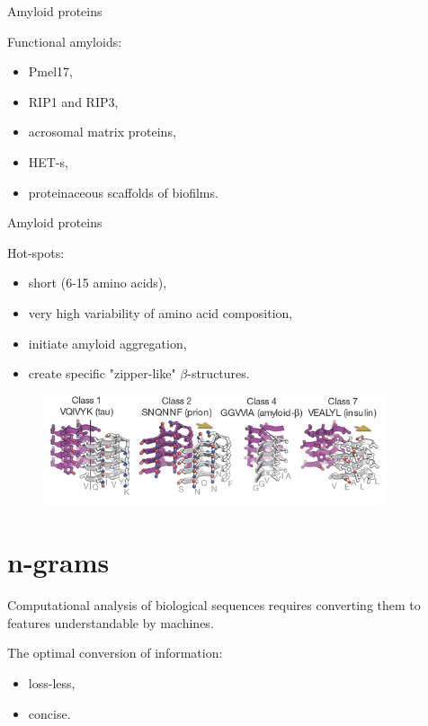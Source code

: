 \documentclass{beamer}\usepackage[]{graphicx}\usepackage[]{color}
\begin{document}
\begin{frame}{Amyloid proteins}

Functional amyloids:

\begin{itemize}
\item Pmel17,
\item RIP1 and RIP3,
\item acrosomal matrix proteins,
\item HET-s,
\item proteinaceous scaffolds of biofilms. 
\end{itemize}

\end{frame}  

  
\begin{frame}{Amyloid proteins}

Hot-spots:
\begin{itemize}
\item short (6-15 amino acids),
\item very high variability of amino acid composition,
\item initiate amyloid aggregation,
\item create specific "zipper-like" $\beta$-structures.
\end{itemize}

\begin{figure} 
\includegraphics[width=0.9\textwidth]{static_figure/zipper_structure.jpg}
\end{figure}

\footnotesize\citet{sawaya_atomic_2007}
\end{frame}


\section{n-grams}

\begin{frame}
Computational analysis of biological sequences requires converting them to features understandable by machines.

The optimal conversion of information:
\begin{itemize}
\item loss-less,
\item concise.
\end{itemize}
\end{frame}  
\end{document}
